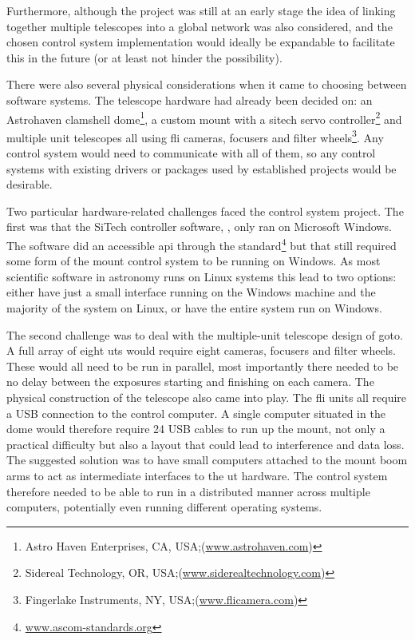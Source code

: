 \begin{colsection}
\begin{colsection}
Furthermore, although the project was still at an early stage the idea of linking together multiple telescopes into a global network was also considered, and the chosen control system implementation would ideally be expandable to facilitate this in the future (or at least not hinder the possibility).

There were also several physical considerations when it came to choosing between software systems. The telescope hardware had already been decided on: an Astrohaven clamshell dome\footnote{Astro Haven Enterprises, CA, USA;\@ (\url{www.astrohaven.com})}, a custom mount with a \gls{sitech} servo controller\footnote{Sidereal Technology, OR, USA;\@ (\url{www.siderealtechnology.com})} and multiple unit telescopes all using \gls{fli} cameras, focusers and filter wheels\footnote{Fingerlake Instruments, NY, USA;\@ (\url{www.flicamera.com})}. Any control system would need to communicate with all of them, so any control systems with existing drivers or packages used by established projects would be desirable.

Two particular hardware-related challenges faced the control system project. The first was that the SiTech controller software, , only ran on Microsoft Windows. The software did an accessible \gls{api} through the  standard\footnote{\url{www.ascom-standards.org}} but that still required some form of the mount control system to be running on Windows. As most scientific software in astronomy runs on Linux systems this lead to two options: either have just a small interface running on the Windows machine and the majority of the system on Linux, or have the entire system run on Windows.

The second challenge was to deal with the multiple-unit telescope design of \gls{goto}. A full array of eight \glspl{ut} would require eight cameras, focusers and filter wheels. These would all need to be run in parallel, most importantly there needed to be no delay between the exposures starting and finishing on each camera. The physical construction of the telescope also came into play. The \gls{fli} units all require a USB connection to the control computer. A single computer situated in the dome would therefore require 24 USB cables to run up the mount, not only a practical difficulty but also a layout that could lead to interference and data loss. The suggested solution was to have small computers attached to the mount boom arms to act as intermediate interfaces to the \gls{ut} hardware. The control system therefore needed to be able to run in a distributed manner across multiple computers, potentially even running different operating systems.


\end{colsection}
\end{colsection}
